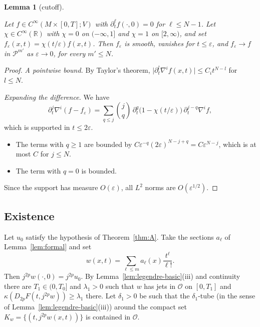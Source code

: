 \documentclass[11pt,reqno]{amsart}
\newtheorem{lemma}[theorem]{Lemma}
\theoremstyle{definition}
\theoremstyle{remark}
\newcommand{\R}{\mathbb{R}}
\newcommand{\Pp}{\mathcal{P}}
\newcommand{\Par}{\mathcal{O}}
\newcommand{\abs}[1]{\lvert #1\rvert}
\newcommand{\lean}[1]{}
\newcommand{\uses}[1]{}
\numberwithin{equation}{section}
\begin{document}
\begin{lemma}[cutoff]\label{lem:cutoff}
\lean{ShortTime.ParabolicSpace.tendsto_cutoff, ShortTime.cutoffFamily, ShortTime.jointlySmoothOn_cutoffFamily, ShortTime.cutoffFamily_eq_zero, ShortTime.tendsto_parabolicInner_cutoff}
\uses{def:parabolic}
Let $f\in C^\infty(M\times[0,T];V)$ with $\partial_t^\ell f(\cdot,0)=0$ for $\ell\le N-1$. Let
$\chi\in C^\infty(\R)$ with $\chi=0$ on $(-\infty,1]$ and $\chi=1$ on $[2,\infty)$, and set
$f_\varepsilon(x,t)=\chi(t/\varepsilon)f(x,t)$. Then $f_\varepsilon$ is smooth, vanishes for
$t\le\varepsilon$, and $f_\varepsilon\to f$ in $\Pp^{m'}$ as $\varepsilon\to0$, for every $m'\le N$.
\end{lemma}

\begin{proof}
\emph{A pointwise bound.} By Taylor's theorem, $\abs{\partial_t^l\nabla^if(x,t)}\le C_it^{N-l}$ for
$l\le N$.

\emph{Expanding the difference.} We have
\[
  \partial_t^j\nabla^i(f-f_\varepsilon)
  =\sum_{q\le j}\binom jq\,\partial_t^q\bigl(1-\chi(t/\varepsilon)\bigr)\,\partial_t^{j-q}\nabla^if,
\]
which is supported in $t\le2\varepsilon$.
\begin{itemize}[nosep]
\item The terms with $q\ge1$ are bounded by
  $C\varepsilon^{-q}(2\varepsilon)^{N-j+q}=C\varepsilon^{N-j}$, which is at most $C$ for $j\le N$.
\item The term with $q=0$ is bounded.
\end{itemize}
Since the support has measure $O(\varepsilon)$, all $L^2$ norms are $O(\varepsilon^{1/2})$.
\end{proof}

\subsection{Existence}\label{sec:existence}

Let $u_0$ satisfy the hypothesis of Theorem~\ref{thm:A}. Take the sections $a_\ell$ of
Lemma~\ref{lem:formal} and set
\[
  w(x,t)=\sum_{\ell\le m}a_\ell(x)\frac{t^\ell}{\ell!}.
\]
Then $j^{2p}w(\cdot,0)=j^{2p}u_0$. By Lemma~\ref{lem:legendre-basic}(iii) and continuity there are
$T_1\in(0,T_0]$ and $\lambda_1>0$ such that $w$ has jets in $\Par$ on $[0,T_1]$ and
$\kappa(D_{2p}F(t,j^{2p}w))\ge\lambda_1$ there. Let $\delta_1>0$ be such that the $\delta_1$-tube
(in the sense of Lemma~\ref{lem:legendre-basic}(iii)) around the compact set
$K_w=\{(t,j^{2p}w(x,t))\}$ is contained in $\Par$.
\end{document}
